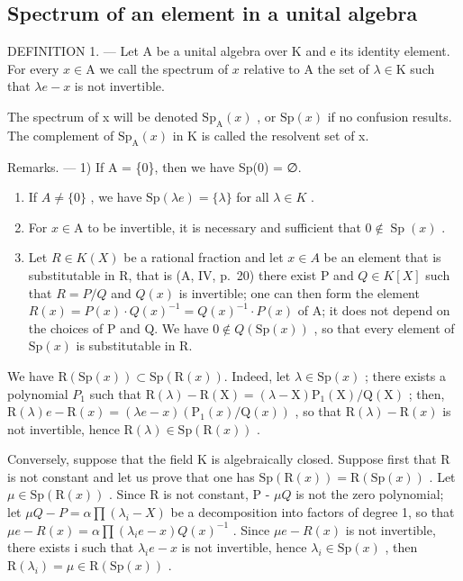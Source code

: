 \subsection{Spectrum of an element in a unital algebra}

DEFINITION 1. --- Let A be a unital algebra over K and e its identity element. For every \(x \in \mathrm{A}\) we call the spectrum of \(x\) relative to A the set of \(\lambda \in \mathrm{K}\) such that \(\lambda e - x\) is not invertible.

The spectrum of x will be denoted \(\mathrm{Sp}_{\mathrm{A}}(x)\) , or \(\mathrm{Sp}(x)\) if no confusion results. The complement of \(\mathrm{Sp}_{\mathrm{A}}(x)\) in K is called the resolvent set of x.

Remarks. --- 1) If A = \{0\}, then we have Sp(0) = ∅.

\begin{enumerate}
\def\labelenumi{\arabic{enumi})}
\setcounter{enumi}{1}
\item
  If \(A \neq \{0\}\) , we have \(\mathrm{Sp}(\lambda e) = \{\lambda\}\) for all \(\lambda \in K\) .
\item
  For \(x \in \mathrm{A}\) to be invertible, it is necessary and sufficient that \(0 \notin \operatorname{Sp}(x)\) .
\item
  Let \(R \in K(X)\) be a rational fraction and let \(x \in A\) be an element that is substitutable in R, that is (A, IV, p.~20) there exist P and \(Q \in K[X]\) such that \(R = P/Q\) and \(Q(x)\) is invertible; one can then form the element \(R(x) = P(x) \cdot Q(x)^{-1} = Q(x)^{-1} \cdot P(x)\) of A; it does not depend on the choices of P and Q. We have \(0 \notin Q(\mathrm{Sp}(x))\) , so that every element of \(\mathrm{Sp}(x)\) is substitutable in R.
\end{enumerate}

We have \(\mathrm{R}(\mathrm{Sp}(x)) \subset \mathrm{Sp}(\mathrm{R}(x))\). Indeed, let \(\lambda \in \mathrm{Sp}(x)\) ; there exists a polynomial \(P_{1}\) such that \(\mathrm{R}(\lambda) - \mathrm{R}(\mathrm{X}) = (\lambda - \mathrm{X})\mathrm{P}_{1}(\mathrm{X}) / \mathrm{Q}(\mathrm{X})\) ; then, \(\mathrm{R}(\lambda)e - \mathrm{R}(x) = (\lambda e - x)(\mathrm{P}_{1}(x)/\mathrm{Q}(x))\) , so that \(\mathrm{R}(\lambda) - \mathrm{R}(x)\) is not invertible, hence \(\mathrm{R}(\lambda) \in \mathrm{Sp}(\mathrm{R}(x))\) .

Conversely, suppose that the field K is algebraically closed. Suppose first that R is not constant and let us prove that one has \(\mathrm{Sp}(\mathrm{R}(x)) = \mathrm{R}(\mathrm{Sp}(x))\) . Let \(\mu \in \mathrm{Sp}(\mathrm{R}(x))\) . Since R is not constant, P - \(\mu Q\) is not the zero polynomial; let \(\mu Q - P = \alpha \prod (\lambda_i - X)\) be a decomposition into factors of degree 1, so that \(\mu e - R(x) = \alpha \prod (\lambda_i e - x) Q(x)^{-1}\) . Since \(\mu e - R(x)\) is not invertible, there exists i such that \(\lambda_i e - x\) is not invertible, hence \(\lambda_i \in \mathrm{Sp}(x)\) , then \(\mathrm{R}(\lambda_i) = \mu \in \mathrm{R}(\mathrm{Sp}(x))\) .

